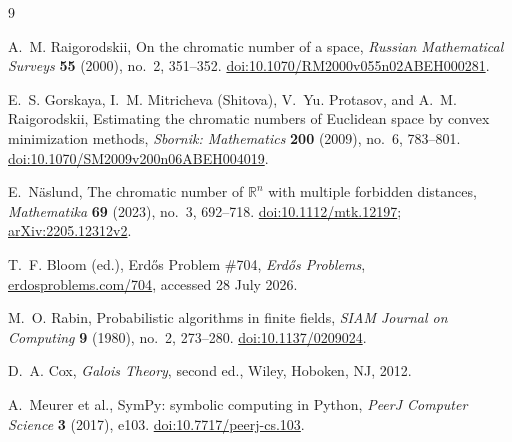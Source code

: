 \documentclass[11pt]{article}
\theoremstyle{remark}
\begin{document}
\begin{thebibliography}{9}

A.~M. Raigorodskii,
\newblock On the chromatic number of a space,
\newblock \emph{Russian Mathematical Surveys} \textbf{55} (2000), no.~2, 351--352.
\newblock \href{https://doi.org/10.1070/RM2000v055n02ABEH000281}{doi:10.1070/RM2000v055n02ABEH000281}.

E.~S. Gorskaya, I.~M. Mitricheva (Shitova), V.~Yu. Protasov, and A.~M. Raigorodskii,
\newblock Estimating the chromatic numbers of Euclidean space by convex minimization methods,
\newblock \emph{Sbornik: Mathematics} \textbf{200} (2009), no.~6, 783--801.
\newblock \href{https://doi.org/10.1070/SM2009v200n06ABEH004019}{doi:10.1070/SM2009v200n06ABEH004019}.

E.~N\"aslund,
\newblock The chromatic number of \(\mathbb R^n\) with multiple forbidden distances,
\newblock \emph{Mathematika} \textbf{69} (2023), no.~3, 692--718.
\newblock \href{https://doi.org/10.1112/mtk.12197}{doi:10.1112/mtk.12197}; \href{https://arxiv.org/abs/2205.12312}{arXiv:2205.12312v2}.

T.~F. Bloom (ed.),
\newblock Erd\H{o}s Problem \#704,
\newblock \emph{Erd\H{o}s Problems},
\newblock \href{https://www.erdosproblems.com/704}{erdosproblems.com/704}, accessed 28 July 2026.

M.~O. Rabin,
\newblock Probabilistic algorithms in finite fields,
\newblock \emph{SIAM Journal on Computing} \textbf{9} (1980), no.~2, 273--280.
\newblock \href{https://doi.org/10.1137/0209024}{doi:10.1137/0209024}.

D.~A. Cox,
\newblock \emph{Galois Theory}, second ed.,
\newblock Wiley, Hoboken, NJ, 2012.

A.~Meurer et al.,
\newblock SymPy: symbolic computing in Python,
\newblock \emph{PeerJ Computer Science} \textbf{3} (2017), e103.
\newblock \href{https://doi.org/10.7717/peerj-cs.103}{doi:10.7717/peerj-cs.103}.

\end{thebibliography}
\end{document}

